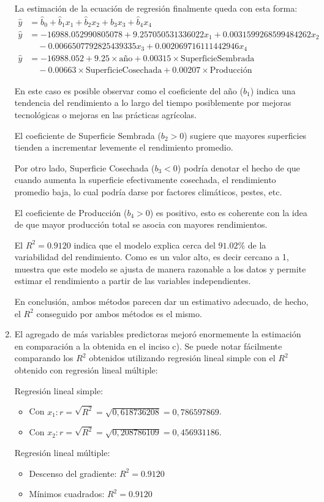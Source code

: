 \documentclass[spanish,12pt,a4paper]{article}
\begin{document}
\begin{enumerate}[label=\alph*)]
		La estimación de la ecuación de regresión finalmente queda con esta forma: 
		\begin{align*}
			\hat{y} &= \hat{b}_0 + \hat{b}_1 x_1 + \hat{b}_2 x_2 + \hat{b}_3 x_3 + \hat{b}_4 x_4 \\
			\hat{y} &= -16988.052990805078 + 9.257050531336022 x_1 + 0.0031599268599484262 x_2 \\
			&\quad - 0.0066507792825439335 x_3 + 0.002069716111442946 x_4 \\
			\hat{y} &= -16988.052 + 9.25 \times \text{año} + 0.00315 \times \text{SuperficieSembrada} \\
			&\quad - 0.00663 \times \text{SuperficieCosechada} + 0.00207 \times \text{Producción}
		\end{align*}
		
		En este caso es posible observar como el coeficiente del año ($b_1$) indica una tendencia del rendimiento a lo largo del tiempo posiblemente por mejoras tecnológicas o mejoras en las prácticas agrícolas.
		
		El coeficiente de Superficie Sembrada ($b_2 > 0$) sugiere que mayores superficies tienden a incrementar levemente el rendimiento promedio.
		
		Por otro lado, Superficie Cosechada ($b_3 < 0$) podría denotar el hecho de que cuando aumenta la superficie efectivamente cosechada, el rendimiento promedio baja, lo cual podría darse por factores climáticos, pestes, etc.
		
		El coeficiente de Producción ($b_4 > 0$) es positivo, esto es coherente con la idea de que mayor producción total se asocia con mayores rendimientos.
		
		El $R^2 = 0.9120$ indica que el modelo explica cerca del $91.02\%$ de la variabilidad del rendimiento. Como es un valor alto, es decir cercano a 1, muestra que este modelo se ajusta de manera razonable a los datos y permite estimar el rendimiento a partir de las variables independientes.
		
		En conclusión, ambos métodos parecen dar un estimativo adecuado, de hecho, el $R^2$ conseguido por ambos métodos es el mismo.
		
		\item El agregado de más variables predictoras mejoró enormemente la estimación en comparación a la obtenida en el inciso c). Se puede notar fácilmente comparando los $R^2$ obtenidos utilizando regresión lineal simple con el $R^2$ obtenido con regresión lineal múltiple:
		
		Regresión lineal simple:
		\begin{itemize}
			\item Con $x_1: r = \sqrt{R^2} = \sqrt{0,618736208} = 0,786597869$.
			\item Con $x_2: r = \sqrt{R^2} = \sqrt{0,208786109} = 0,456931186$.
		\end{itemize}
		Regresión lineal múltiple:
		\begin{itemize}
			\item Descenso del gradiente: $R^2 = 0.9120$
			\item Mínimos cuadrados: $R^2 = 0.9120$
		\end{itemize}
		

\end{enumerate}
\end{document}
